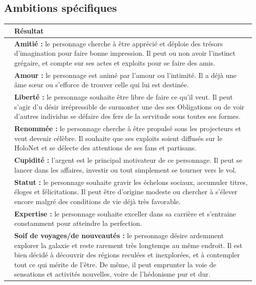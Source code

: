 \documentclass[twoside]{article}
\begin{document}
\subsection*{Ambitions spécifiques}
\begin{table}[h]
	\centering
	\begin{tabular}{|m{2cm}|m{13cm}|}
		\hline
		\centering{\cellcolor{DarkRed} {\large \textcolor{PureWhite}{\textbf{D100}}}} & \cellcolor{DarkRed} {\large \textcolor{PureWhite}{\textbf{Résultat}}} \\
		\hline
		\centering{01 -- 10} & \textbf{Amitié :} le personnage cherche à être apprécié et déploie des trésors d'imagination pour faire bonne impression. Il peut ou non avoir l'instinct grégaire, et compte sur ses actes et exploits pour se faire des amis. \\
		\hline
		\centering{11 -- 20} & \textbf{Amour :} le personnage est animé par l'amour ou l'intimité. Il a déjà une âme sœur ou s'efforce de trouver celle qui lui est destinée. \\
		\hline
		\centering{21 -- 30} & \textbf{Liberté :} le personnage souhaite être libre de faire ce qu'il veut. Il peut s'agir d'u désir irrépressible de surmonter une des ses Obligations ou de voir d'autres individus se défaire des fers de la servitude sous toutes ses formes. \\
		\hline
		\centering{31 -- 40} & \textbf{Renommée :} le personnage cherche à être propulsé sous les projecteurs et veut devenir célèbre. Il souhaite que ses exploits soient diffusés sur le HoloNet et se délecte des attentions de ses fans et partisans. \\
		\hline
		\centering{41 -- 50} & \textbf{Cupidité :} l'argent est le principal motivateur de ce personnage. Il peut se lancer dans les affaires, investir ou tout simplement se tourner vers le vol. \\
		\hline
		\centering{51 -- 60} & \textbf{Statut :} le personnage souhaite gravir les échelons sociaux, accumuler titres, éloges et félicitations. Il peut être d'origine modeste ou chercher à s'élever encore malgré des conditions de vie déjà très favorable. \\
		\hline
		\centering{61 -- 70} & \textbf{Expertise :} le personnage souhaite exceller dans sa carrière et s'entraine constamment pour atteindre la perfection. \\
		\hline
		\centering{71 -- 80} & \textbf{Soif de voyages/de nouveautés :} le personnage désire ardemment explorer la galaxie et reste rarement très longtemps au même endroit. Il est bien décidé à découvrir des régions reculées et inexplorées, et à contempler tout ce qui mérite de l'être. De même, il peut emprunter la voie de sensations et activités nouvelles, voire de l'hédonisme pur et dur. \\

\end{tabular}
\end{table}
\end{document}
